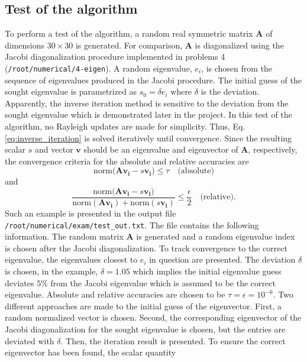 \documentclass{article}
\begin{document}
	\subsection*{Test of the algorithm}
	To perform a test of the algorithm, a random real symmetric matrix $\mathbf{A}$ of dimensions $30\times 30$ is generated. For comparison, $\mathbf{A}$ is diagonalized using the Jacobi diagonalization procedure implemented in problems 4 (\texttt{/root/numerical/4-eigen}). A random eigenvalue, $e_{i}$, is chosen from the sequence of eigenvalues produced in the Jacobi procedure. The initial guess of the sought eigenvalue is parametrized as $s_{0} = \delta e_{i}$ where $\delta$ is the deviation. Apparently, the inverse iteration method is sensitive to the deviation from the sought eigenvalue which is demonstrated later in the project. In this test of the algorithm, no Rayleigh updates are made for simplicity. Thus, Eq. \ref{eq:inverse_iteration} is solved iteratively until convergence. Since the resulting scalar $s$ and vector $\mathbf{v}$ should be an eigenvalue and eigenvector of $\mathbf{A}$, respectively, the convergence criteria for the absolute and relative accuracies are
	\begin{equation}
		\textrm{norm}\Big(\mathbf{A}\mathbf{v_{i}} - s\mathbf{v_{i}}\Big)\leq\tau\quad\textrm{(absolute)}
	\end{equation}
	and
	\begin{equation}
	\frac{\textrm{norm}\Big(\mathbf{A}\mathbf{v_{i}} - s\mathbf{v_{i}}\Big)}{\textrm{norm}(\mathbf{A}\mathbf{v_{i}}) + \textrm{norm}(s\mathbf{v_{i}})}\leq\frac{\epsilon}{2}\quad\textrm{(relative)}.
	\label{eq:relative_error}
	\end{equation}
	Such an example is presented in the output file \texttt{/root/numerical/exam/test\_out.txt}. The file contains the following information. The random matrix $\mathbf{A}$ is generated and a random eigenvalue index is chosen after the Jacobi diagonalization. To track convergence to the correct eigenvalue, the eigenvalues closest to $e_{i}$ in question are presented. The deviation $\delta$ is chosen, in the example, $\delta = 1.05$ which implies the initial eigenvalue guess deviates $5\%$ from the Jacobi eigenvalue which is assumed to be the correct eigenvalue. Absolute and relative accuracies are chosen to be $\tau=\epsilon=10^{-6}$. Two different approaches are made to the initial guess of the eigenvector. First, a random normalized vector is chosen. Second, the corresponding eigenvector of the Jacobi diagonalization for the sought eigenvalue is chosen, but the entries are deviated with $\delta$. Then, the iteration result is presented. To ensure the correct eigenvector has been found, the scalar quantity
\end{document}
